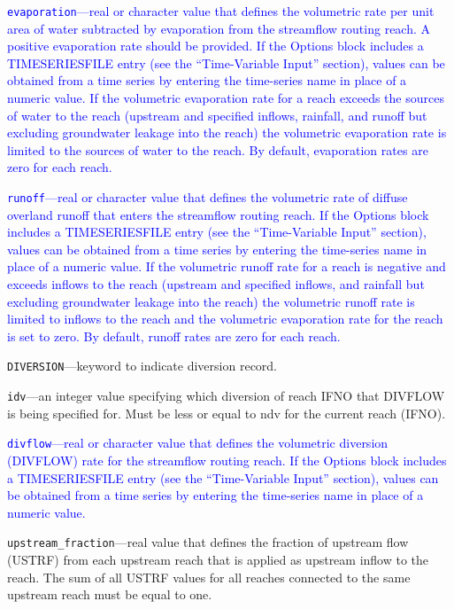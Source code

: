 \begin{description}
\item \textcolor{blue}{\texttt{evaporation}---real or character value that defines the volumetric rate per unit area of water subtracted by evaporation from the streamflow routing reach. A positive evaporation rate should be provided. If the Options block includes a TIMESERIESFILE entry (see the ``Time-Variable Input'' section), values can be obtained from a time series by entering the time-series name in place of a numeric value. If the volumetric evaporation rate for a reach exceeds the sources of water to the reach (upstream and specified inflows, rainfall, and runoff but excluding groundwater leakage into the reach) the volumetric evaporation rate is limited to the sources of water to the reach. By default, evaporation rates are zero for each reach.}

\item \textcolor{blue}{\texttt{runoff}---real or character value that defines the volumetric rate of diffuse overland runoff that enters the streamflow routing reach. If the Options block includes a TIMESERIESFILE entry (see the ``Time-Variable Input'' section), values can be obtained from a time series by entering the time-series name in place of a numeric value. If the volumetric runoff rate for a reach is negative and exceeds inflows to the reach (upstream and specified inflows, and rainfall but excluding groundwater leakage into the reach) the volumetric runoff rate is limited to inflows to the reach and the volumetric evaporation rate for the reach is set to zero. By default, runoff rates are zero for each reach.}

\item \texttt{DIVERSION}---keyword to indicate diversion record.

\item \texttt{idv}---an integer value specifying which diversion of reach IFNO that DIVFLOW is being specified for.  Must be less or equal to ndv for the current reach (IFNO).

\item \textcolor{blue}{\texttt{divflow}---real or character value that defines the volumetric diversion (DIVFLOW) rate for the streamflow routing reach. If the Options block includes a TIMESERIESFILE entry (see the ``Time-Variable Input'' section), values can be obtained from a time series by entering the time-series name in place of a numeric value.}

\item \texttt{upstream\_fraction}---real value that defines the fraction of upstream flow (USTRF) from each upstream reach that is applied as upstream inflow to the reach. The sum of all USTRF values for all reaches connected to the same upstream reach must be equal to one.


\end{description}
